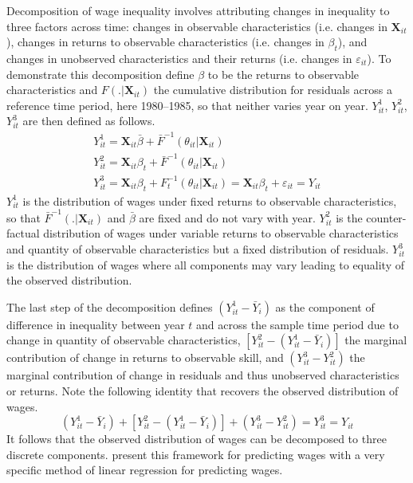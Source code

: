 \documentclass[notitlepage,12pt]{article}
\newcommand{\1}[1]{\ensuremath{\mathbb{1}\left( #1 \right)}}               %
\begin{document}
Decomposition of wage inequality involves attributing changes in inequality to three factors across time: changes in observable characteristics (i.e. changes in $\mathbf{X}_{it}$), changes in returns to observable characteristics (i.e. changes in $\beta_t$), and changes in unobserved characteristics and their returns (i.e. changes in $\varepsilon_{it}$).  \nocite{autor200914}To demonstrate this decomposition define $\beta$ to be the returns to observable characteristics and $F(. | \mathbf{X}_{it})$ the cumulative distribution for residuals across a reference time period, here 1980--1985, so that neither varies year on year.  $Y_{it}^1$, $Y_{it}^2$, $Y_{it}^3$ are then defined as follows.
\begin{gather}
  \label{eqn:decomposition_Y1}
  Y_{it}^1 = \mathbf{X}_{it}\bar{\beta} + \bar{F}^{-1}(\theta_{it} | \mathbf{X}_{it}) \\
  \label{eqn:decomposition_Y2}
  Y_{it}^2 = \mathbf{X}_{it}\beta_t + \bar{F}^{-1}(\theta_{it} | \mathbf{X}_{it}) \\
  \label{eqn:decomposition_Y2}
  Y_{it}^3  = \mathbf{X}_{it}\beta_t + F_{t}^{-1}(\theta_{it} | \mathbf{X}_{it}) = \mathbf{X}_{it}\beta_t + \varepsilon_{it}  = Y_{it}
\end{gather}
$Y_{it}^1$ is the distribution of wages under fixed returns to observable characteristics, so that $\bar{F}^{-1}(. | \mathbf{X}_{it})$ and $\bar{\beta}$ are fixed and do not vary with year.  $Y_{it}^2$ is the counter-factual distribution of wages under variable returns to observable characteristics and quantity of observable characteristics but a fixed distribution of residuals.  $Y_{it}^3$ is the distribution of wages where all components may vary leading to equality of the observed distribution.

The last step of the decomposition defines $(Y_{it}^1-\bar{Y}_i)$ as the component of difference in inequality between year $t$ and across the sample time period due to change in quantity of observable characteristics, $[Y_{it}^2 - (Y_{it}^1-\bar{Y}_i)]$ the marginal contribution of change in returns to observable skill, and $(Y_{it}^3 - Y_{it}^2)$ the marginal contribution of change in residuals and thus unobserved characteristics or returns.  Note the following identity that recovers the observed distribution of wages.
\begin{equation}
  (Y_{it}^1-\bar{Y}_i) + [Y_{it}^2 - (Y_{it}^1-\bar{Y}_i)] + (Y_{it}^3 - Y_{it}^2) = Y_{it}^3 = Y_{it}
\end{equation}
It follows that the observed distribution of wages can be decomposed to three discrete components.  \cite{juhn1993wage} present this framework for predicting wages with a very specific method of linear regression for predicting wages.
\end{document}

